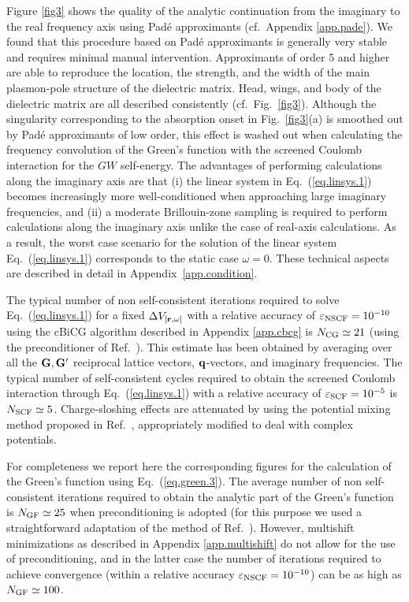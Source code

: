 \documentclass[twocolumn,prb,showpacs,superscriptaddress]{revtex4}
\def\w{\omega}
\def\q{{\bf q}}
\def\G{{\bf G}}
\def\Gp{{\bf G^\prime}}
\def\r{{\bf r}}
\begin{document}
Figure \ref{fig3} shows the quality of the analytic continuation from the imaginary to
the real frequency axis using Pad\'e approximants (cf.\ Appendix \ref{app.pade}).\cite{pade1,pade2} We found that this procedure based on 
Pad\'e approximants is generally very stable and requires minimal manual intervention.
Approximants of order 5 and higher are able to reproduce the location, the strength, and the width of
the main plasmon-pole structure of the dielectric matrix. Head, wings, and body of the
dielectric matrix are all described consistently (cf.\ Fig.\ \ref{fig3}). Although the singularity
corresponding to the absorption onset in Fig.\ \ref{fig3}(a) is smoothed out by 
Pad\'e approximants of low order, this effect
is washed out when calculating the frequency convolution of the Green's function with
the screened Coulomb interaction for the $GW$ self-energy.
The advantages of performing calculations along the imaginary axis are that (i) the 
linear system in Eq.\ (\ref{eq.linsys.1}) becomes increasingly more well-conditioned
when approaching large imaginary frequencies, and (ii) a moderate Brillouin-zone sampling is
required to perform calculations along the imaginary axis unlike the case of real-axis
calculations. As a result, the worst case scenario for the solution
of the linear system Eq.\ (\ref{eq.linsys.1}) corresponds to the static case $\w=0$.
These technical aspects are described in detail in Appendix~\ref{app.condition}.

The typical number of non self-consistent iterations required to solve Eq.\ (\ref{eq.linsys.1})
for a fixed $\Delta V_{[\r,\w]}$ with a relative accuracy of $\varepsilon_{\rm NSCF}=10^{-10}$
using the cBiCG algorithm described in Appendix \ref{app.cbcg} is $N_{\rm CG}\simeq 21$
(using the preconditioner of Ref.\ ). This estimate has been obtained by averaging
over all the $\G,\Gp$ reciprocal lattice vectors, $\q$-vectors, and imaginary frequencies.
The typical number of self-consistent cycles required to obtain the screened Coulomb
interaction through Eq.\ (\ref{eq.linsys.1}) with a relative accuracy of $\varepsilon_{\rm SCF}=10^{-5}$ 
is $N_{\rm SCF}\simeq 5$.
Charge-sloshing effects are attenuated by using the potential mixing method proposed in
 Ref.\ , appropriately modified to deal with complex potentials. 

For completeness we report here the corresponding figures for
the calculation of the Green's function using Eq.~(\ref{eq.green.3}). The average number
of non self-consistent iterations required to obtain the analytic part of the Green's
function is $N_{\rm GF}\simeq 25$ when preconditioning is adopted (for this purpose 
we used a straightforward adaptation 
of the method of Ref.\ ). However, multishift minimizations as
described in Appendix \ref{app.multishift} do not allow for the use of preconditioning, and in the
latter case the number of iterations required to achieve convergence (within a relative
accuracy $\varepsilon_{\rm NSCF}=10^{-10}$) can be as high as $N_{\rm GF}\simeq 100$. 
\end{document}
